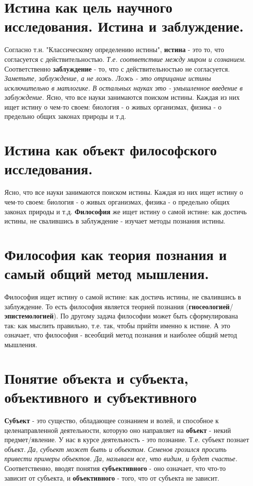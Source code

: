 \documentclass[12pt,a4paper]{article}
\begin{document}
\section{Истина как цель научного исследования. Истина и заблуждение.}
Согласно т.н. "Классическому определению истины", \textbf{истина} - это то, что согласуется с действительностью. \textit{Т.е. соответствие между миром и сознанием}.
Соответственно \textbf{заблуждение} - то, что с действительностью не согласуется. \textit{Заметьте, заблуждение, а не ложь. Ложь - это отрицание истины исключительно в матлогике. В остальных науках это - умышленное введение в заблуждение.}
Ясно, что все науки занимаются поиском истины.
Каждая из них ищет истину о чем-то своем: биология - о живых организмах, физика - о предельно общих законах природы и т.д.

\section{Истина как объект философского исследования.}
Ясно, что все науки занимаются поиском истины.
Каждая из них ищет истину о чем-то своем: биология - о живых организмах, физика - о предельно общих законах природы и т.д.
\textbf{Философия} же ищет истину о самой истине: как достичь истины, не свалившись в заблуждение - изучает методы познания истины.

\section{Философия как теория познания и самый общий метод мышления.}
Философия ищет истину о самой истине: как достичь истины, не свалившись в заблуждение.
То есть философия является теорией познания (\textbf{гносеологией}/\textbf{эпистемологией}).
По другому задача философии может быть сформулирована так: как мыслить правильно, т.е. так, чтобы прийти именно к истине.
А это означает, что философия - всеобщий метод познания и наиболее общий метод мышления. 

\section{Понятие объекта и субъекта, объективного и субъективного}
\textbf{Субъект} - это существо, обладающее сознанием и волей, и способное к целенаправленной деятельности,
которую оно направляет на \textbf{объект} - некий предмет/явление.
У нас в курсе деятельность - это познание.
Т.е. субъект познает объект.
\textit{Да, субъект может быть и объектом. Семенов грозился просить привести примеры объектов.
Да, называем все, что видим, и будет счастье.} 
Соответственно, вводят понятия \textbf{субъективного} - оно означает, что что-то зависит от субъекта,
и \textbf{объективного} - того, что от субъекта не зависит.
\end{document}
